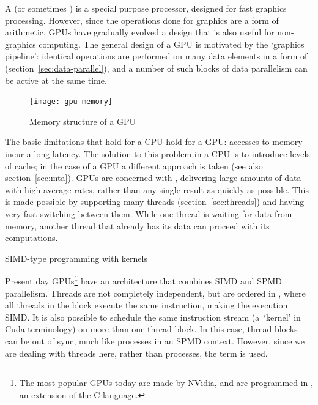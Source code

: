 
A  (or sometimes ) is a special purpose processor,
designed for fast graphics processing. However, since the operations
done for graphics are a form of arithmetic, \acp{GPU} have gradually
evolved a design that is also useful for non-graphics computing.
The general design of a \ac{GPU} is motivated by the `graphics
pipeline': identical
operations are performed on many data elements
in a form of 
(section~\ref{sec:data-parallel}),
and a number of such
blocks of data parallelism can be active at the same time.

\begin{figure}
\texttt{[image: gpu-memory]}
\caption{Memory structure of a GPU}
\label{fig:gpu-memory}
\end{figure}
%
The basic limitations that hold for a CPU hold for a \ac{GPU}:
accesses to memory incur a long latency. The solution to this problem
in a CPU is to introduce levels of cache; in the case of a \ac{GPU} a
different approach is taken (see also
section~\ref{sec:mta}). \acp{GPU} are concerned with
, delivering large amounts of data
with high average rates, rather than any single result as quickly as
possible. This is made possible by supporting many threads
(section~\ref{sec:threads}) and having very fast switching between
them. While one thread is waiting for data from memory, another thread
that already has its data can proceed with its computations.

 {SIMD-type programming with kernels}
\label{sec:gpu-kernel}

Present day \acp{GPU}\footnote{The most popular GPUs today are made by
  NVidia, and are programmed in , an extension of the
  C language.}%
have an architecture that combines \ac{SIMD}
and \ac{SPMD} parallelism. Threads are not completely independent, but
are ordered in , where all threads in the
block execute the same instruction, making the execution \ac{SIMD}. It
is also possible to schedule the same instruction stream
(a~`kernel' in Cuda terminology) on more than one
thread block. In this case, thread blocks can be out of sync, much
like processes in an \ac{SPMD} context. However, since we are dealing
with threads here, rather than processes, the term  is used.

